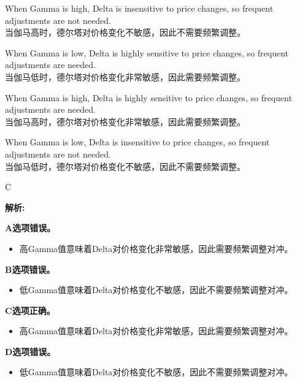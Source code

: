 \documentclass{article}
\newenvironment{explanation}
{\textbf{解析:}\par}
{\par}
\begin{document}
\begin{choices}
    \item When Gamma is high, Delta is insensitive to price changes, so frequent adjustments are not needed.\\
    当伽马高时，德尔塔对价格变化不敏感，因此不需要频繁调整。
    \item When Gamma is low, Delta is highly sensitive to price changes, so frequent adjustments are needed.\\
    当伽马低时，德尔塔对价格变化非常敏感，因此需要频繁调整。
    \item When Gamma is high, Delta is highly sensitive to price changes, so frequent adjustments are needed.\\
    当伽马高时，德尔塔对价格变化非常敏感，因此需要频繁调整。
    \item When Gamma is low, Delta is insensitive to price changes, so frequent adjustments are not needed.\\
    当伽马低时，德尔塔对价格变化不敏感，因此不需要频繁调整。
\end{choices}

\begin{correctanswer}
    C
\end{correctanswer}

\begin{explanation}
    \textbf{A选项错误。}
    \begin{itemize}
        \item 高Gamma值意味着Delta对价格变化非常敏感，因此需要频繁调整对冲。
    \end{itemize}

    \textbf{B选项错误。}
    \begin{itemize}
        \item 低Gamma值意味着Delta对价格变化不敏感，因此不需要频繁调整对冲。
    \end{itemize}

    \textbf{C选项正确。}
    \begin{itemize}
        \item 高Gamma值意味着Delta对价格变化非常敏感，因此需要频繁调整对冲。
    \end{itemize}

    \textbf{D选项错误。}
    \begin{itemize}
        \item 低Gamma值意味着Delta对价格变化不敏感，因此不需要频繁调整对冲。
    \end{itemize}
\end{explanation}
\end{document}
